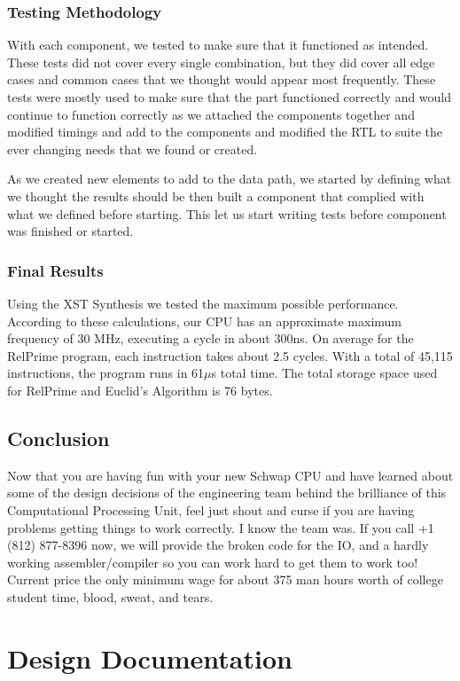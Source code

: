 \documentclass{report}
\begin{document}
		\subsection{Testing Methodology}
			With each component, we tested to make sure that it functioned as intended. These tests did not cover every single combination, but they did cover all edge cases and common cases that we thought would appear most frequently. These tests were mostly used to make sure that the part functioned correctly and would continue to function correctly as we attached the components together and modified timings and add to the components and modified the RTL to suite the ever changing needs that we found or created.\par
			As we created new elements to add to the data path, we started by defining what we thought the results should be then built a component that complied with what we defined before starting. This let us start writing tests before component was finished or started.
		\subsection{Final Results}
			Using the XST Synthesis we tested the maximum possible performance. According to these calculations, our CPU has an approximate maximum frequency of 30 MHz, executing a cycle in about 300ns. On average for the RelPrime program, each instruction takes about 2.5 cycles. With a total of 45,115 instructions, the program runs in 61$\mu$s total time. The total storage space used for RelPrime and Euclid's Algorithm is 76 bytes.
	\section{Conclusion}
		Now that you are having fun with your new Schwap CPU and have learned about some of the design decisions of the engineering team behind the brilliance of this Computational Processing Unit, feel just shout and curse if you are having problems getting things to work correctly. I know the team was. If you call +1 (812) 877-8396 now, we will provide the broken code for the IO, and a hardly working assembler/compiler so you can work hard to get them to work too! Current price the only minimum wage for about 375 man hours worth of college student time, blood, sweat, and tears.
\chapter{Design Documentation}
	
\end{document}
